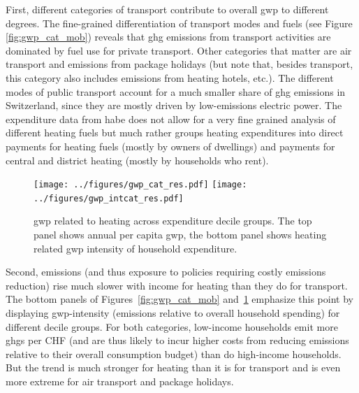 \documentclass[a4paper,11pt,abstract=true]{scrartcl}
\begin{document}
First, different categories of transport contribute to overall \ac{gwp} to different degrees.
The fine-grained differentiation of transport modes and fuels (see Figure \ref{fig:gwp_cat_mob}) reveals that \ac{ghg} emissions from transport activities are dominated by fuel use for private transport.
Other categories that matter are air transport and emissions from package holidays (but note that, besides transport, this category also includes emissions from heating hotels, etc.).
The different modes of public transport account for a much smaller share of \ac{ghg} emissions in Switzerland, since they are mostly driven by low-emissions electric power.
The expenditure data from \ac{habe} does not allow for a very fine grained analysis of different heating fuels but much rather groups heating expenditures into direct payments for heating fuels (mostly by owners of dwellings) and payments for central and district heating (mostly by households who rent).
\begin{figure}[htp]
  \centering
  \texttt{[image: ../figures/gwp\_cat\_res.pdf]}
  \texttt{[image: ../figures/gwp\_intcat\_res.pdf]}
  \caption[\ac{gwp} per decile]{
    \ac{gwp} related to heating across expenditure decile groups.
    The top panel shows annual per capita \ac{gwp}, the bottom panel shows heating related \ac{gwp} intensity of household expenditure.
  }
  \label{fig:gwp_cat_res}
\end{figure}

Second, emissions (and thus exposure to policies requiring costly emissions reduction) rise much slower with income for heating than they do for transport.
The bottom panels of Figures~\ref{fig:gwp_cat_mob} and~\ref{fig:gwp_cat_res} emphasize this point by displaying \ac{gwp}-intensity (emissions relative to overall household spending) for different decile groups.
For both categories, low-income households emit more \acp{ghg} per CHF (and are thus likely to incur higher costs from reducing emissions relative to their overall consumption budget) than do high-income households.
But the trend is much stronger for heating than it is for transport and is even more extreme for air transport and package holidays.


\end{document}
